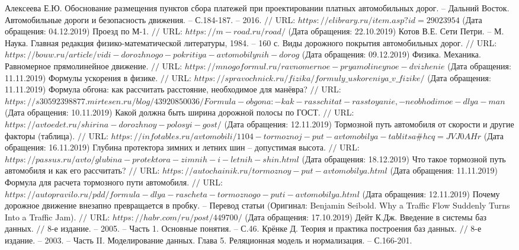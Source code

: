 \begin{thebibliography}{00}
	Алексеева Е.Ю. Обоснование размещения пунктов сбора платежей при проектировании платных автомобильных дорог. -- Дальний Восток. Автомобильные дороги и безопасность движения. -- С.184-187. -- 2016. $//$ URL: $https://elibrary.ru/item.asp?id=29023954$ (Дата обращения: 04.12.2019)
	Проезд по М-1. $//$ URL: $https://m-road.ru/road/$ (Дата обращения: 22.10.2019)
	Котов В.Е. Сети Петри. -- М. Наука. Главная редакция физико-математической литературы, 1984. -- 160 с.
	Виды дорожного покрытия автомобильных дорог. $//$ URL: $https://bouw.ru/article/vidi-dorozhnogo-pokritiya-avtomobilynih-dorog$ (Дата обращения: 09.12.2019)
	Физика. Механика. Равномерное прямолинейное движение. $//$ URL: $https://mnogoformul.ru/ravnomernoe-pryamolineynoe-dvizhenie$ (Дата обращения: 11.11.2019)
	Формулы ускорения в физике. $//$ URL: $https://spravochnick.ru/fizika/formuly\_uskoreniya\_v\_fizike/$ (Дата обращения: 11.11.2019)
	Формула обгона: как рассчитать расстояние, необходимое для манёвра? $//$ URL: $https://s30592398877.mirtesen.ru/blog/43920850036/Formula-obgona:-kak-rasschitat-rasstoyanie,-neobhodimoe-dlya-man$ (Дата обращения: 10.11.2019)
	Какой должна быть ширина дорожной полосы по ГОСТ. $//$ URL: $https://avtoedet.ru/shirina-dorozhnoy-polosyi-gost/$ (Дата обращения: 12.11.2019)
	Тормозной путь автомобиля от скорости и другие факторы (таблица). $//$ URL: $https://infotables.ru/avtomobili/1104-tormoznoj-put-avtomobilya-tablitsa\#hcq=JVJ0AHr$ (Дата обращения: 16.11.2019)
	Глубина протектора зимних и летних шин -- допустимая высота. $//$ URL: $ https://passus.ru/avto/glubina-protektora-zimnih-i-letnih-shin.html$ (Дата обращения: 18.12.2019)
	Что такое тормозной путь автомобиля и как его рассчитать? $//$ URL: $https://autochainik.ru/tormoznoy-put-avtomobilya.html$ (Дата обращения: 11.11.2019)
	Формула для расчета тормозного пути автомобиля. $//$ URL: $https://autopravilo.ru/pdd/formula-dlya-rascheta-tormoznogo-puti-avtomobilya.html$ (Дата обращения: 12.11.2019)
	Почему дорожное движение внезапно превращается в пробку. -- Перевод статьи (Оригинал: Benjamin Seibold. Why a Traffic Flow Suddenly Turns Into a Traffic Jam). $//$ URL: $https://habr.com/ru/post/449700/$ (Дата обращения: 17.10.2019)
	Дейт К.Дж. Введение в системы баз данных. $//$ 8-е издание. -- 2005. -- Часть 1. Основные понятия. -- С.46.
	Крёнке Д. Теория и практика построения баз данных. $//$ 8-е издание. -- 2003. -- Часть II. Моделирование данных. Глава 5. Реляционная модель и нормализация. -- С.166-201.

\end{thebibliography}

